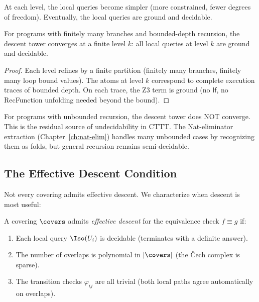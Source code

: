 At each level, the local queries become simpler (more constrained,
fewer degrees of freedom).  Eventually, the local queries are ground
and decidable.

\begin{theorem}
\label{thm:tower-convergence}
For programs with finitely many branches and bounded-depth
recursion, the descent tower converges at a finite level $k$:
all local queries at level $k$ are ground and decidable.
\end{theorem}

\begin{proof}
Each level refines by a finite partition (finitely many branches,
finitely many loop bound values).  The atoms at level $k$ correspond
to complete execution traces of bounded depth.  On each trace, the
Z3 term is ground (no $\mathsf{If}$, no RecFunction unfolding needed
beyond the bound).
\end{proof}

\begin{remark}
For programs with unbounded recursion, the descent tower does NOT
converge.  This is the residual source of undecidability in CTTT.
The Nat-eliminator extraction (Chapter~\ref{ch:nat-elim}) handles
many unbounded cases by recognizing them as folds, but general
recursion remains semi-decidable.
\end{remark}

\subsection{The Effective Descent Condition}

Not every covering admits effective descent.  We characterize when
descent is most useful:

\begin{definition}
A covering $\covers$ admits \emph{effective descent} for the
equivalence check $f \equiv g$ if:
\begin{enumerate}
  \item Each local query $\Iso(U_i)$ is decidable (terminates with
    a definite answer).
  \item The number of overlaps is polynomial in $|\covers|$ (the
    \v{C}ech complex is sparse).
  \item The transition checks $\varphi_{ij}$ are all trivial
    (both local paths agree automatically on overlaps).
\end{enumerate}
\end{definition}


